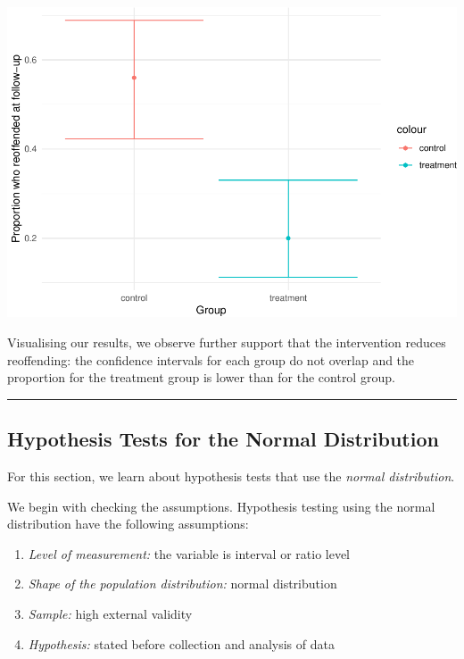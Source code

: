 \documentclass[
]{book}
\begin{document}
\includegraphics{06-hypotheses_files/figure-latex/unnamed-chunk-20-1.pdf}

Visualising our results, we observe further support that the intervention reduces reoffending: the confidence intervals for each group do not overlap and the proportion for the treatment group is lower than for the control group.

\begin{center}\rule{0.5\linewidth}{0.5pt}\end{center}

\hypertarget{hypothesis-tests-for-the-normal-distribution}{%
\subsection{Hypothesis Tests for the Normal Distribution}\label{hypothesis-tests-for-the-normal-distribution}}

For this section, we learn about hypothesis tests that use the \emph{normal distribution}.

We begin with checking the assumptions. Hypothesis testing using the normal distribution have the following assumptions:

\begin{enumerate}
\def\labelenumi{\arabic{enumi}.}
\item
  \emph{Level of measurement:} the variable is interval or ratio level
\item
  \emph{Shape of the population distribution:} normal distribution
\item
  \emph{Sample:} high external validity
\item
  \emph{Hypothesis:} stated before collection and analysis of data
\end{enumerate}
\end{document}
